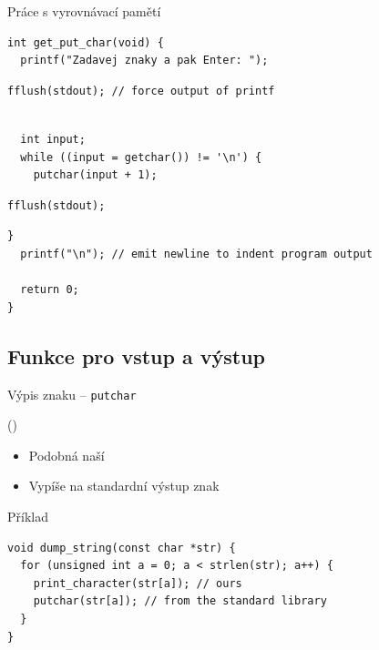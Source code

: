 \begin{frame}[fragile]{Práce s vyrovnávací pamětí}

  \begin{lstlisting}[belowskip=0pt]
int get_put_char(void) {
  printf("Zadavej znaky a pak Enter: ");
  \end{lstlisting}
  \begin{lstlisting}[aboveskip=0pt,belowskip=0pt]
  fflush(stdout); // force output of printf
  \end{lstlisting}
  \begin{lstlisting}[aboveskip=0pt,belowskip=0pt]

  int input;
  while ((input = getchar()) != '\n') {
    putchar(input + 1);
  \end{lstlisting}
  \begin{lstlisting}[aboveskip=0pt,belowskip=0pt]
    fflush(stdout);
  \end{lstlisting}
  \begin{lstlisting}[aboveskip=0pt]
  }
  printf("\n"); // emit newline to indent program output

  return 0;
}
\end{lstlisting}

\end{frame}

\subsection*{Funkce pro vstup a výstup}
\frame{\subsectionpage}

\begin{frame}[fragile]{Výpis znaku -- \texttt{putchar}}

   ()
  \begin{itemize}
    \item Podobná naší 

    \pause

    \item Vypíše na standardní výstup znak 
  \end{itemize}

\begin{block}{Příklad}
\begin{lstlisting}
void dump_string(const char *str) {
  for (unsigned int a = 0; a < strlen(str); a++) {
    print_character(str[a]); // ours
    putchar(str[a]); // from the standard library
  }
}
\end{lstlisting}
\end{block}

\end{frame}

